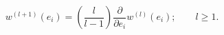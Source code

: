 \begin{equation}
w^{(l+1)}(e_{i})=\left( \frac{l}{l-1}\right) \frac{\partial }{\partial e_{i}}%
w^{(l)}(e_{i});\qquad l\geq 1.
\end{equation}

